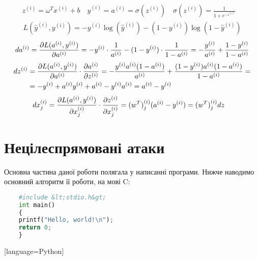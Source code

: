 \documentclass[a4paper,14pt]{extreport}
\newcommand{\tran}{^{T}}
\newcommand{\ith}{^{(i)}}
\begin{document}
	\begin{align*}
		z\ith = \omega\tran x\ith + b \quad
		\hat{y}\ith = a\ith = \sigma(z\ith) \quad
		\sigma(z\ith) = \frac{1}{1 + e^{-z\ith}} \quad
	\end{align*}
	\begin{align*}
		L(\hat{y}\ith, y\ith) = -y\ith \log(\hat{y}\ith) - (1 - y\ith) \log(1 - \hat{y}\ith)
	\end{align*}
	\begin{align*}
		da\ith = \pdv{ L(a\ith, y\ith)}{a\ith} = -y\ith \cdot \frac{1}{a\ith} -(1 - y\ith) \cdot \frac{1}{1-a\ith} = -\frac{y\ith}{a\ith} + \frac{1-y\ith}{1-a\ith}
	\end{align*}
	\begin{align*}
		dz\ith &= \pdv{L(a\ith, y\ith)}{a\ith} \cdot \pdv{a\ith}{z\ith} =
		-\frac{y\ith a\ith (1-a\ith)}{a\ith} + \frac{(1-y\ith) a\ith (1-a\ith)}{1-a\ith} = \\
		& = -y\ith + a\ith y\ith + a\ith - y\ith a\ith  = a\ith - y\ith
	\end{align*}
	\begin{align*}
		dx\ith_j &= \pdv{L(a\ith, y\ith)}{x\ith_j} \cdot \pdv{z\ith}{x\ith_j} = 
		(w\tran)\ith_j (a\ith - y\ith) = (w\tran)\ith_j dz
	\end{align*}



	
	\section{Нецілеспрямовані атаки} 
	Основна частина даної роботи полягала у написанні програми. Нижче наводимо основний алгоритм її роботи, на мові C:
	
	\begin{lstlisting}[language=Python]
	% ============================================ %
	#include &lt;stdio.h&gt;
	int main() 
	{ 
	printf("Hello, world!\n"); 
	return 0; 
	} 
	\end{lstlisting}[language=Python]
\end{document}
